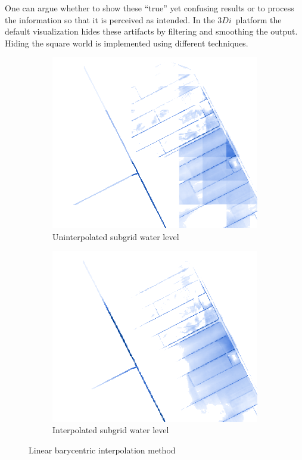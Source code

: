 \documentclass[a4paper]{article}
\DeclareRobustCommand{\threedi}{$3Di$~}
\begin{document}
One can argue whether to show these ``true'' yet confusing results or to process the information so that it is perceived as intended. In the \threedi platform the default visualization hides these artifacts by filtering and smoothing the output. Hiding the square world is implemented using different techniques.

\begin{figure}[htpb]
  \centering
  \begin{subfigure}{0.4\textwidth}
    \includegraphics[width=1\textwidth]{arta}
    \caption{Uninterpolated subgrid water level}
    \label{fig:arta}
  \end{subfigure}
  \begin{subfigure}{0.4\textwidth}
    \includegraphics[width=1\textwidth]{artb}
    \caption{Interpolated subgrid water level}
    \label{fig:artb}
  \end{subfigure}
  \label{fig:artifacts}
  \caption{Linear barycentric interpolation method}
\end{figure}
\end{document}
